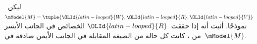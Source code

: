 \documentclass[../../../include/open-logic-section]{subfiles}
\begin{document}
\begin{prob}
  ليكن~$\mModel{M} = \tuple{\OLId{latin-looped}{W}, \OLId{latin-looped}{R}, \OLId{latin-looped}{V}}$ نموذجًا. أثبت أنه إذا حققت~$\OLId{latin-looped}{R}$
  الخصائص في الجانب الأيسر من
  ، كانت كل حالة من الصيغة
  المقابلة في الجانب الأيمن صادقة في~$\mModel{M}$.
\end{prob}
\end{document}
